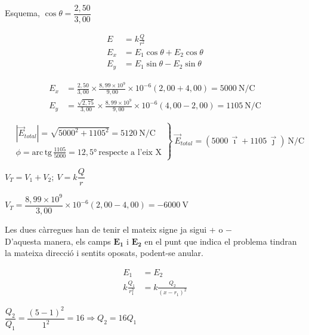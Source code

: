 \begin{solapartat}

 Esquema, $\cos\theta = \dfrac{2,50}{3,00}$

\begin{align*}
E &= k\frac{Q}{r^2}\\
E_x &= E_1\cos\theta + E_2\cos\theta\\
E_y &= E_1\sin\theta - E_2\sin\theta
\end{align*}

\begin{align*}
E_x &= \frac{2,50}{3,00}\times\frac{8,99\times 10^{9}}{9,00}\times 10^{-6}(2,00 + 4,00) = 5000\ \mathrm{N/C}\\
E_y &= \frac{\sqrt{2,75}}{3,00}\times\frac{8,99\times 10^{9}}{9,00}\times 10^{-6}(4,00 - 2,00) = 1105\ \mathrm{N/C}
\end{align*}

\[ \left.\begin{aligned}
&\left|\vec{E}_\mathit{total}\right| = \sqrt{5000^2 + 1105^2} = 5120\ \mathrm{N/C}\\
&\phi = \mathrm{arc\,tg}\,\frac{1105}{5000} = 12,5°\ \text{respecte a l'eix X}
\end{aligned}\right\}\ \vec{E}_\mathit{total} = \left(5000\,\vec{\imath} + 1105\,\vec{\jmath}\right)\ \mathrm{N/C} \]

 $V_T = V_1 + V_2;\ V = k\dfrac{Q}{r}$

 $V_T = \dfrac{8,99\times 10^{9}}{3,00}\times 10^{-6}(2,00 - 4,00) = -6000\ \mathrm{V}$
\end{solapartat}

\begin{solapartat}
 Les dues càrregues han de tenir el mateix signe ja sigui + o $-$\\
D'aquesta manera, els camps $\boldsymbol{E_1}$ i $\boldsymbol{E_2}$ en el punt que indica el problema tindran la mateixa direcció i sentits oposats, podent-se anular.

\begin{align*}
E_1 &= E_2\\
k\frac{Q_1}{r_1^2} &= k\frac{Q_2}{(x - r_1)^2}
\end{align*}

 $\dfrac{Q_2}{Q_1} = \dfrac{(5 - 1)^2}{1^2} = 16 \Rightarrow Q_2 = 16Q_1$
\end{solapartat}
